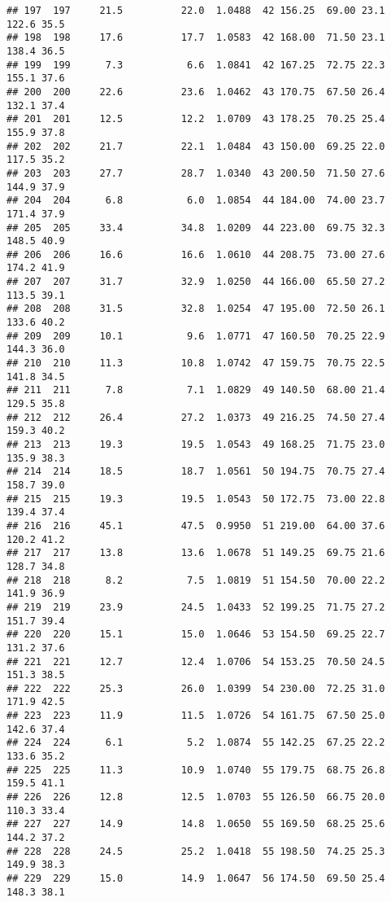 \documentclass[
]{book}
\theoremstyle{definition}
\theoremstyle{definition}
\theoremstyle{definition}
\theoremstyle{definition}
\theoremstyle{remark}
\begin{document}
\begin{verbatim}
## 197  197     21.5          22.0  1.0488  42 156.25  69.00 23.1    122.6 35.5
## 198  198     17.6          17.7  1.0583  42 168.00  71.50 23.1    138.4 36.5
## 199  199      7.3           6.6  1.0841  42 167.25  72.75 22.3    155.1 37.6
## 200  200     22.6          23.6  1.0462  43 170.75  67.50 26.4    132.1 37.4
## 201  201     12.5          12.2  1.0709  43 178.25  70.25 25.4    155.9 37.8
## 202  202     21.7          22.1  1.0484  43 150.00  69.25 22.0    117.5 35.2
## 203  203     27.7          28.7  1.0340  43 200.50  71.50 27.6    144.9 37.9
## 204  204      6.8           6.0  1.0854  44 184.00  74.00 23.7    171.4 37.9
## 205  205     33.4          34.8  1.0209  44 223.00  69.75 32.3    148.5 40.9
## 206  206     16.6          16.6  1.0610  44 208.75  73.00 27.6    174.2 41.9
## 207  207     31.7          32.9  1.0250  44 166.00  65.50 27.2    113.5 39.1
## 208  208     31.5          32.8  1.0254  47 195.00  72.50 26.1    133.6 40.2
## 209  209     10.1           9.6  1.0771  47 160.50  70.25 22.9    144.3 36.0
## 210  210     11.3          10.8  1.0742  47 159.75  70.75 22.5    141.8 34.5
## 211  211      7.8           7.1  1.0829  49 140.50  68.00 21.4    129.5 35.8
## 212  212     26.4          27.2  1.0373  49 216.25  74.50 27.4    159.3 40.2
## 213  213     19.3          19.5  1.0543  49 168.25  71.75 23.0    135.9 38.3
## 214  214     18.5          18.7  1.0561  50 194.75  70.75 27.4    158.7 39.0
## 215  215     19.3          19.5  1.0543  50 172.75  73.00 22.8    139.4 37.4
## 216  216     45.1          47.5  0.9950  51 219.00  64.00 37.6    120.2 41.2
## 217  217     13.8          13.6  1.0678  51 149.25  69.75 21.6    128.7 34.8
## 218  218      8.2           7.5  1.0819  51 154.50  70.00 22.2    141.9 36.9
## 219  219     23.9          24.5  1.0433  52 199.25  71.75 27.2    151.7 39.4
## 220  220     15.1          15.0  1.0646  53 154.50  69.25 22.7    131.2 37.6
## 221  221     12.7          12.4  1.0706  54 153.25  70.50 24.5    151.3 38.5
## 222  222     25.3          26.0  1.0399  54 230.00  72.25 31.0    171.9 42.5
## 223  223     11.9          11.5  1.0726  54 161.75  67.50 25.0    142.6 37.4
## 224  224      6.1           5.2  1.0874  55 142.25  67.25 22.2    133.6 35.2
## 225  225     11.3          10.9  1.0740  55 179.75  68.75 26.8    159.5 41.1
## 226  226     12.8          12.5  1.0703  55 126.50  66.75 20.0    110.3 33.4
## 227  227     14.9          14.8  1.0650  55 169.50  68.25 25.6    144.2 37.2
## 228  228     24.5          25.2  1.0418  55 198.50  74.25 25.3    149.9 38.3
## 229  229     15.0          14.9  1.0647  56 174.50  69.50 25.4    148.3 38.1

\end{verbatim}
\end{document}
